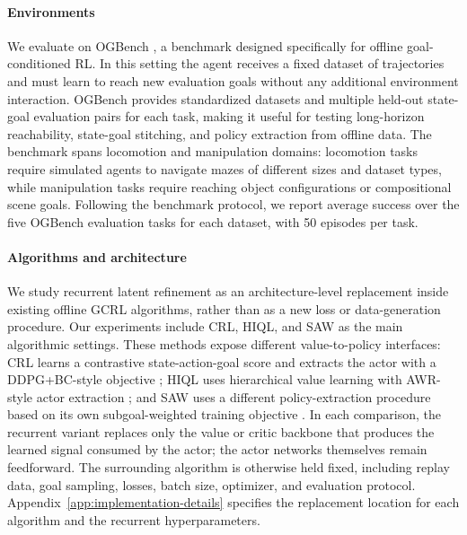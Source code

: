 \documentclass{article}
\begin{document}
\paragraph{Environments}
We evaluate on OGBench \citep{ogbench}, a benchmark designed specifically for offline goal-conditioned RL. In this setting the agent receives a fixed dataset of trajectories and must learn to reach new evaluation goals without any additional environment interaction. OGBench provides standardized datasets and multiple held-out state-goal evaluation pairs for each task, making it useful for testing long-horizon reachability, state-goal stitching, and policy extraction from offline data. The benchmark spans locomotion and manipulation domains: locomotion tasks require simulated agents to navigate mazes of different sizes and dataset types, while manipulation tasks require reaching object configurations or compositional scene goals. Following the benchmark protocol, we report average success over the five OGBench evaluation tasks for each dataset, with 50 episodes per task.


\paragraph{Algorithms and architecture}
We study recurrent latent refinement as an architecture-level replacement inside existing offline GCRL algorithms, rather than as a new loss or data-generation procedure. Our experiments include CRL, HIQL, and SAW as the main algorithmic settings. These methods expose different value-to-policy interfaces: CRL learns a contrastive state-action-goal score and extracts the actor with a DDPG+BC-style objective \citep{crl, td3bc}; HIQL uses hierarchical value learning with AWR-style actor extraction \citep{hiql}; and SAW uses a different policy-extraction procedure based on its own subgoal-weighted training objective \citep{saw}. In each comparison, the recurrent variant replaces only the value or critic backbone that produces the learned signal consumed by the actor; the actor networks themselves remain feedforward. The surrounding algorithm is otherwise held fixed, including replay data, goal sampling, losses, batch size, optimizer, and evaluation protocol. Appendix~\ref{app:implementation-details} specifies the replacement location for each algorithm and the recurrent hyperparameters.
\end{document}
